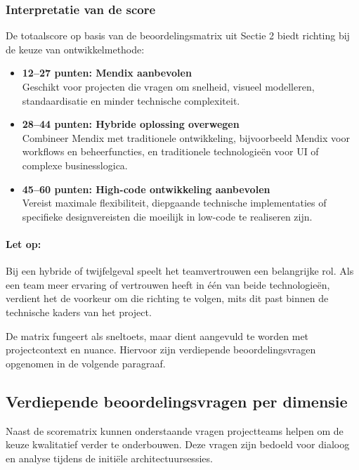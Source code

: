 \subsubsection{Interpretatie van de score}
De totaalscore op basis van de beoordelingsmatrix uit Sectie 2 biedt richting bij de keuze van ontwikkelmethode:

\begin{itemize}
    \item \textbf{12–27 punten: Mendix aanbevolen} \\
    Geschikt voor projecten die vragen om snelheid, visueel modelleren, standaardisatie en minder technische complexiteit.
    
    \item \textbf{28–44 punten: Hybride oplossing overwegen} \\
    Combineer Mendix met traditionele ontwikkeling, bijvoorbeeld Mendix voor workflows en beheerfuncties, en traditionele technologieën voor UI of complexe businesslogica.
    
    \item \textbf{45–60 punten: High-code ontwikkeling aanbevolen} \\
    Vereist maximale flexibiliteit, diepgaande technische implementaties of specifieke designvereisten die moeilijk in low-code te realiseren zijn.
\end{itemize}

\paragraph{Let op:} Bij een hybride of twijfelgeval speelt het teamvertrouwen een belangrijke rol. Als een team meer ervaring of vertrouwen heeft in één van beide technologieën, verdient het de voorkeur om die richting te volgen, mits dit past binnen de technische kaders van het project.

De matrix fungeert als sneltoets, maar dient aangevuld te worden met projectcontext en nuance. Hiervoor zijn verdiepende beoordelingsvragen opgenomen in de volgende paragraaf.

\subsection{Verdiepende beoordelingsvragen per dimensie}
Naast de scorematrix kunnen onderstaande vragen projectteams helpen om de keuze kwalitatief verder te onderbouwen. Deze vragen zijn bedoeld voor dialoog en analyse tijdens de initiële architectuursessies.

